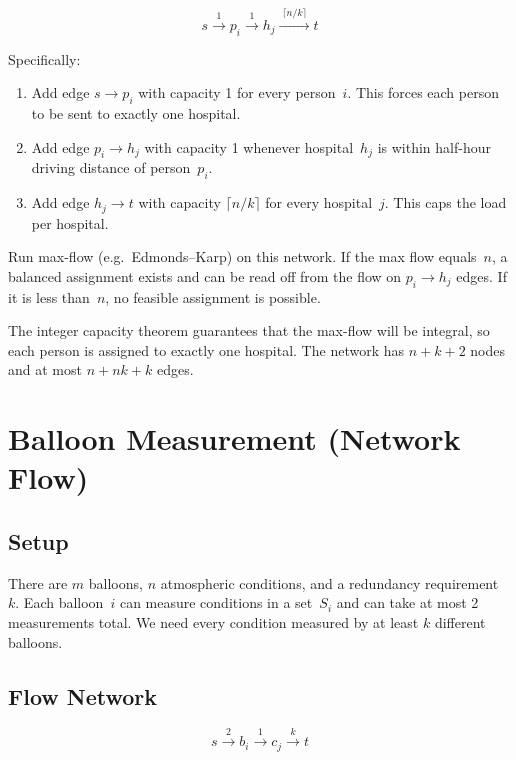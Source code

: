 \documentclass[11pt,a4paper]{article}
\begin{document}
\begin{equation*}
    s \xrightarrow{\;1\;} p_i \xrightarrow{\;1\;} h_j \xrightarrow{\;\lceil n/k \rceil\;} t
\end{equation*}

Specifically:
\begin{enumerate}
    \item Add edge $s \to p_i$ with capacity 1 for every person~$i$. This forces each person to be sent to exactly one hospital.
    \item Add edge $p_i \to h_j$ with capacity 1 whenever hospital~$h_j$ is within half-hour driving distance of person~$p_i$.
    \item Add edge $h_j \to t$ with capacity $\lceil n/k \rceil$ for every hospital~$j$. This caps the load per hospital.
\end{enumerate}

Run max-flow (e.g.\ Edmonds--Karp) on this network. If the max flow equals~$n$, a balanced assignment exists and can be read off from the flow on $p_i \to h_j$ edges. If it is less than~$n$, no feasible assignment is possible.

The integer capacity theorem guarantees that the max-flow will be integral, so each person is assigned to exactly one hospital. The network has $n + k + 2$ nodes and at most $n + nk + k$ edges.


\section{Balloon Measurement (Network Flow)}

\subsection*{Setup}

There are $m$ balloons, $n$ atmospheric conditions, and a redundancy requirement~$k$. Each balloon~$i$ can measure conditions in a set~$S_i$ and can take at most 2 measurements total. We need every condition measured by at least $k$ different balloons.

\subsection*{Flow Network}

\begin{equation*}
    s \xrightarrow{\;2\;} b_i \xrightarrow{\;1\;} c_j \xrightarrow{\;k\;} t
\end{equation*}
\end{document}
